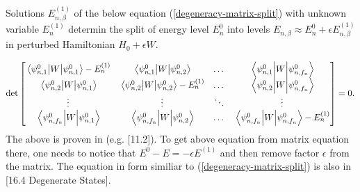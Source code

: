 \documentclass[main.tex]{subfiles}
\begin{document}
Solutions $E_{n,\beta}^{(1)}$ of the below equation (\ref{degeneracy-matrix-split}) with unknown variable $E^{(1)}_n$ determin the split of energy level $E^0_n$ into levels $E_{n,\beta} \approx E_n^0 + \epsilon E^{(1)}_{n,\beta} $ in perturbed Hamiltonian $H_0 + \epsilon W$. 

\begin{equation}
\label{degeneracy-matrix-split}
\det\begin{bmatrix}
    \mel{\psi^0_{n,1}}{W}{\psi^0_{n,1}} - E_n^{(1)} & \mel{\psi^0_{n,1}}{W}{\psi^0_{n,2}} & \dots  & \mel{\psi^0_{n,1}}{W}{\psi^0_{n,f_n}}\\
    \mel{\psi^0_{n,2}}{W}{\psi^0_{n,1}} &  \mel{\psi^0_{n,2}}{W}{\psi^0_{n,2}} - E_n^{(1)} & \dots  & \mel{\psi^0_{n,2}}{W}{\psi^0_{n,f_n}} \\
    \vdots & \vdots & \ddots & \vdots \\
    \mel{\psi^0_{n,f_n}}{W}{\psi^0_{n,1}} & \mel{\psi^0_{n,f_n}}{W}{\psi^0_{n,2}} & \dots  & \mel{\psi^0_{n,f_n}}{W}{\psi^0_{n,f_n}} - E_n^{(1)}
\end{bmatrix} = 0.
\end{equation}
The above is proven in (e.g. \cite{walter-greiner2001}[11.2]). To get above equation from matrix equation there, one needs to notice that $E^0 - E = -\epsilon E^{(1)}$ and then remove factor $\epsilon$ from the matrix. The equation in form similiar to (\ref{degeneracy-matrix-split}) is also in \cite{desai2010}[16.4 Degenerate States].
\end{document}
